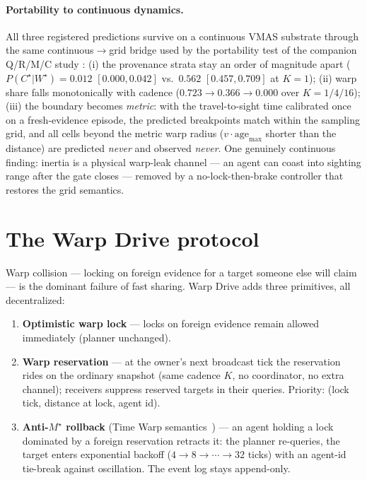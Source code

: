 \documentclass{article}
\newcommand{\wstar}{W^{\star}}
\newcommand{\mstar}{M^{\star}}
\newcommand{\cstar}{C^{\star}}
\begin{document}
\paragraph{Portability to continuous dynamics.} All three registered
predictions survive on a continuous VMAS substrate through the same
continuous$\to$grid bridge used by the portability test of the companion Q/R/M/C study \citep{songlines1}:
(i) the provenance strata stay an order of magnitude apart
($P(\cstar|\wstar)=0.012$ $[0.000,0.042]$ vs.\ $0.562$
$[0.457,0.709]$ at $K{=}1$); (ii) warp share falls monotonically with
cadence ($0.723\to0.366\to0.000$ over $K{=}1/4/16$); (iii) the boundary
becomes \emph{metric}: with the travel-to-sight time calibrated once
on a fresh-evidence episode, the predicted breakpoints match within
the sampling grid, and all cells beyond the metric warp radius
($v\cdot\mathrm{age}_{\max}$ shorter than the distance) are predicted
\emph{never} and observed \emph{never}. One genuinely continuous
finding: inertia is a physical warp-leak channel --- an agent can
coast into sighting range after the gate closes --- removed by a
no-lock-then-brake controller that restores the grid semantics.


\section{The Warp Drive protocol}
\label{p2:sec:drive}

Warp collision --- locking on foreign evidence for a target someone
else will claim --- is the dominant failure of fast sharing. Warp
Drive adds three primitives, all decentralized:

\begin{enumerate}[leftmargin=20pt,itemsep=2pt,topsep=2pt]
\item \textbf{Optimistic warp lock} --- locks on foreign evidence
  remain allowed immediately (planner unchanged).
\item \textbf{Warp reservation} --- at the owner's next broadcast tick
  the reservation rides on the ordinary snapshot (same cadence $K$, no
  coordinator, no extra channel); receivers suppress reserved targets
  in their queries. Priority: (lock tick, distance at lock, agent id).
\item \textbf{Anti-$\mstar$ rollback} (Time Warp
  semantics~\cite{jefferson1985}) --- an agent holding a lock
  dominated by a foreign reservation retracts it: the planner
  re-queries, the target enters exponential backoff
  ($4\to8\to\cdots\to32$ ticks) with an agent-id tie-break against
  oscillation. The event log stays append-only.
\end{enumerate}
\end{document}
